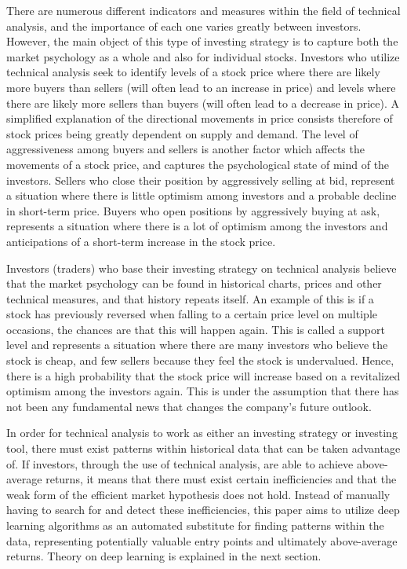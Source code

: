 \indent \newline 
There are numerous different indicators and measures within the field of technical analysis, and the importance of each one varies greatly between investors. However, the main object of this type of investing strategy is to capture both the market psychology as a whole and also for individual stocks. Investors who utilize technical analysis seek to identify levels of a stock price where there are likely more buyers than sellers (will often lead to an increase in price) and levels where there are likely more sellers than buyers (will often lead to a decrease in price). A simplified explanation of the directional movements in price consists therefore of stock prices being greatly dependent on supply and demand. The level of aggressiveness among buyers and sellers is another factor which affects the movements of a stock price, and captures the psychological state of mind of the investors. Sellers who close their position by aggressively selling at bid, represent a situation where there is little optimism among investors and a probable decline in short-term price. Buyers who open positions by aggressively buying at ask, represents a situation where there is a lot of optimism among the investors and anticipations of a short-term increase in the stock price. 

\indent \newline 
Investors (traders) who base their investing strategy on technical analysis believe that the market psychology can be found in historical charts, prices and other technical measures, and that history repeats itself. An example of this is if a stock has previously reversed when falling to a certain price level on multiple occasions, the chances are that this will happen again. This is called a support level and represents a situation where there are many investors who believe the stock is cheap, and few sellers because they feel the stock is undervalued. Hence, there is a high probability that the stock price will increase based on a revitalized optimism among the investors again. This is under the assumption that there has not been any fundamental news that changes the company's future outlook.    

\indent \newline 
In order for technical analysis to work as either an investing strategy or investing tool, there must exist patterns within historical data that can be taken advantage of. If investors, through the use of technical analysis, are able to achieve above-average returns, it means that there must exist certain inefficiencies and that the weak form of the efficient market hypothesis does not hold. Instead of manually having to search for and detect these inefficiencies, this paper aims to utilize deep learning algorithms as an automated substitute for finding patterns within the data, representing potentially valuable entry points and ultimately above-average returns. Theory on deep learning is explained in the next section.          


